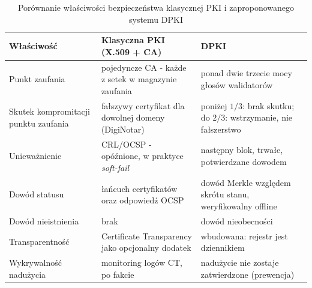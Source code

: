 \begin{table}[htbp]
    \centering
    \caption{Porównanie właściwości bezpieczeństwa klasycznej PKI i zaproponowanego systemu DPKI}
    \label{tab:porownanie-bezp}
    \renewcommand{\arraystretch}{1.15}
    \begin{tabular}{L{0.27\textwidth} L{0.31\textwidth} L{0.31\textwidth}}
        \toprule
        \textbf{Właściwość}                  & \textbf{Klasyczna PKI (X.509 + CA)}                 & \textbf{DPKI}                                                      \\
        \midrule
        Punkt zaufania                       & pojedyncze CA - każde z setek w magazynie zaufania  & ponad dwie trzecie mocy głosów walidatorów                         \\
        \addlinespace
        Skutek kompromitacji punktu zaufania & fałszywy certyfikat dla dowolnej domeny (DigiNotar) & poniżej $1/3$: brak skutku; do $2/3$: wstrzymanie, nie fałszerstwo \\
        \addlinespace
        Unieważnienie                        & CRL/OCSP - opóźnione, w praktyce \emph{soft-fail}   & następny blok, trwałe, potwierdzane dowodem                        \\
        \addlinespace
        Dowód statusu                        & łańcuch certyfikatów oraz odpowiedź OCSP            & dowód Merkle względem skrótu stanu, weryfikowalny offline          \\
        \addlinespace
        Dowód nieistnienia                   & brak                                                & dowód nieobecności                                                 \\
        \addlinespace
        Transparentność                      & Certificate Transparency jako opcjonalny dodatek    & wbudowana: rejestr jest dziennikiem                                \\
        \addlinespace
        Wykrywalność nadużycia               & monitoring logów CT, po fakcie                      & nadużycie nie zostaje zatwierdzone (prewencja)                     \\
        \bottomrule
    \end{tabular}
\end{table}

